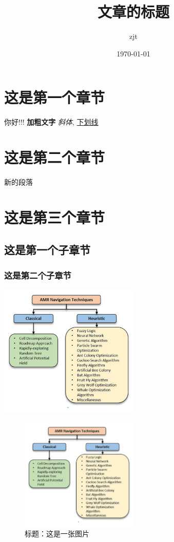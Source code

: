 \documentclass[UTF8]{ctexart}
\title{文章的标题}
\author{zjt}
\date{\today}
\begin{document}
\maketitle
\section{这是第一个章节}
你好!!!%
\textbf{加粗文字}
\textit{斜体},
\underline{下划线}
\section{这是第二个章节}
新的段落%
\section{这是第三个章节}
\subsection{这是第一个子章节}
\subsubsection{这是第二个子章节}
\includegraphics[width=0.5\textwidth]{image}%

\begin{figure}
\centering%
\includegraphics[width=0.5\textwidth]{image}
\caption{标题：这是一张图片}
\end{figure}
\end{document}
